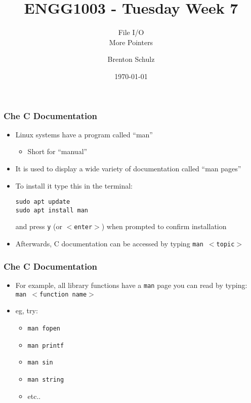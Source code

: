 \documentclass[14pt]{beamer}
\title{ENGG1003 - Tuesday Week 7}
\subtitle{File I/O\\More Pointers}
\author{Brenton Schulz}
\institute{University of Newcastle}
\date{\today}
\begin{document}
\titlepage

\begin{frame}[fragile]
\frametitle{Che C Documentation}
\begin{itemize}
\item Linux systems have a program called ``man''
	\begin{itemize}
		\item Short for ``manual''
	\end{itemize}
\item It is used to display a wide variety of documentation called ``man pages''
\item To install it type this in the terminal:
\begin{lstlisting}[style=pseudo]
sudo apt update 
sudo apt install man
\end{lstlisting}
and press \texttt{y} (or \texttt{$<$enter$>$}) when prompted to confirm installation
\item Afterwards, C documentation can be accessed by typing \texttt{man $<$topic$>$}
\end{itemize}
\end{frame}

\begin{frame}
\frametitle{Che C Documentation}
\begin{itemize}
\item For example, all library functions have a \texttt{man} page you can read by typing:\\\texttt{man $<$function name$>$}
\item eg, try:
	\begin{itemize}
		\item \texttt{man fopen}
		\item \texttt{man printf}
		\item \texttt{man sin}
		\item \texttt{man string}
		\item etc..
	\end{itemize}
\end{itemize}
\end{frame}
\end{document}
